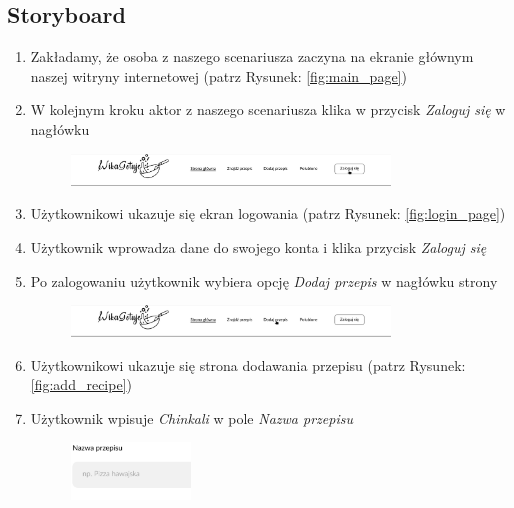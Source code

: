 \documentclass{article}
\begin{document}
\subsection{Storyboard}
\begin{enumerate}
    \item Zakładamy, że osoba z naszego scenariusza zaczyna na ekranie głównym naszej witryny internetowej (patrz Rysunek: \ref{fig:main_page})
    \item W kolejnym kroku aktor z naszego scenariusza klika w przycisk \textit{Zaloguj się} w nagłówku
        \begin{figure}[H]
            \begin{center}
                \includegraphics[width=0.8\textwidth]{images/add_recipe_step1}
            \end{center}
        \end{figure}
    \item Użytkownikowi ukazuje się ekran logowania (patrz Rysunek: \ref{fig:login_page})
    \item Użytkownik wprowadza dane do swojego konta i klika przycisk \textit{Zaloguj się}
    \item Po zalogowaniu użytkownik wybiera opcję \textit{Dodaj przepis} w nagłówku strony
        \begin{figure}[H]
            \begin{center}
                \includegraphics[width=0.8\textwidth]{images/add_recipe_step2}
            \end{center}
        \end{figure}
    \item Użytkownikowi ukazuje się strona dodawania przepisu (patrz Rysunek: \ref{fig:add_recipe})
    \item Użytkownik wpisuje \textit{Chinkali} w pole \textit{Nazwa przepisu}
        \begin{figure}[H]
            \begin{center}
                \includegraphics[width=0.3\textwidth]{images/add_recipe_step3}

\end{center}
\end{figure}
\end{enumerate}
\end{document}
